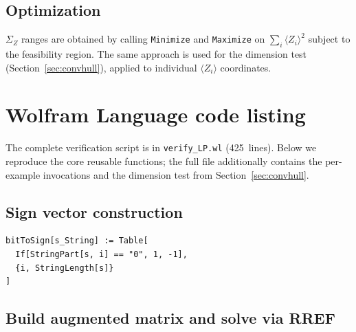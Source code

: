 \documentclass{article}
\newcommand{\SigZ}{\Sigma_Z}
\begin{document}
\subsection{Optimization}

$\SigZ$ ranges are obtained by calling \texttt{Minimize} and \texttt{Maximize} on $\sum_i \langle Z_i\rangle^2$ subject to the feasibility region.
The same approach is used for the dimension test (Section~\ref{sec:convhull}), applied to individual $\langle Z_i\rangle$ coordinates.

\appendix
\section{Wolfram Language code listing}
\label{sec:code}

The complete verification script is in \texttt{verify\_LP.wl} (425~lines).
Below we reproduce the core reusable functions; the full file additionally contains the per-example invocations and the dimension test from Section~\ref{sec:convhull}.

\subsection{Sign vector construction}

\begin{lstlisting}
bitToSign[s_String] := Table[
  If[StringPart[s, i] == "0", 1, -1],
  {i, StringLength[s]}
]
\end{lstlisting}

\subsection{Build augmented matrix and solve via RREF}
\end{document}
